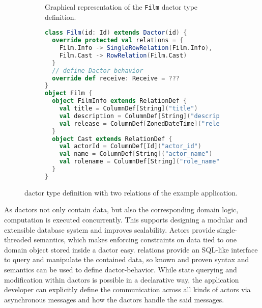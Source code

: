     \begin{figure}
      \centering

      \begin{subfigure}[b]{0.44\textwidth}
        \centering
        
        \caption{Graphical representation of the \texttt{Film} \gls{dactor} type definition.}
        \label{fig:film_diagram}
      \end{subfigure}\hfill
      \begin{subfigure}[b]{0.54\textwidth}
        \centering
        \scriptsize
\begin{lstlisting}[language=Scala]
class Film(id: Id) extends Dactor(id) {
  override protected val relations = {
    Film.Info -> SingleRowRelation(Film.Info),
    Film.Cast -> RowRelation(Film.Cast)
  }
  // define Dactor behavior
  override def receive: Receive = ???
}
object Film {
  object FilmInfo extends RelationDef {
    val title = ColumnDef[String]("title")
    val description = ColumnDef[String]("description")
    val release = ColumnDef[ZonedDateTime]("release")
  }
  object Cast extends RelationDef {
    val actorId = ColumnDef[Id]("actor_id")
    val name = ColumnDef[String]("actor_name")
    val rolename = ColumnDef[String]("role_name")
  }
}
\end{lstlisting}
        \label{lst:film_definition}
      \end{subfigure}
      \caption[\texttt{Film} Dactor type definition with two relations of the example application.]{ \gls{dactor} type definition with two relations of the example application.}
      \label{fig:film_dactor_definition}
    \end{figure}

    As \glspl{dactor} not only contain data, but also the corresponding domain logic, computation is executed concurrently.
    This supports designing a modular and extensible database system and improves scalability.
    Actors provide single-threaded semantics, which makes enforcing constraints on data tied to one domain object stored inside a \gls{dactor} easy.
    \Glspl{relation} provide an SQL-like interface to query and manipulate the contained data, so known and proven syntax and semantics can be used to define \gls{dactor}-behavior.
    While state querying and modification within \glspl{dactor} is possible in a declarative way, the application developer can explicitly define the communication across all kinds of actors via asynchronous messages and how the \glspl{dactor} handle the said messages.

